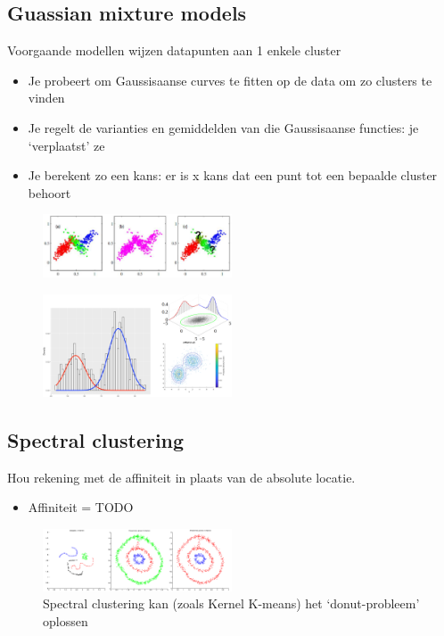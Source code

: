 \documentclass{article}
\begin{document}
\subsection{Guassian mixture models}

Voorgaande modellen wijzen datapunten aan 1 enkele cluster

\begin{itemize}
    \item Je probeert om Gaussisaanse curves te fitten op de data om zo clusters te vinden
    \item Je regelt de varianties en gemiddelden van die Gaussisaanse functies: je `verplaatst' ze
    \item Je berekent zo een kans: er is x kans dat een punt tot een bepaalde cluster behoort 
\end{itemize}

\begin{figure}[H]
    \centering
    \includegraphics[width=0.5\textwidth]{guassian-mixture-models.png}
\end{figure}

\begin{figure}[H]
    \centering
    \includegraphics[width=0.5\textwidth]{guassian-mixture-models2.png}
\end{figure}

\subsection{Spectral clustering}

Hou rekening met de affiniteit in plaats van de absolute locatie.

\begin{itemize}
    \item Affiniteit = TODO
\end{itemize}

\begin{figure}[H]
    \centering
    \includegraphics[width=0.5\textwidth]{spectral-clustering.png}
    \caption{Spectral clustering kan (zoals Kernel K-means) het `donut-probleem' oplossen}
\end{figure}
\end{document}
